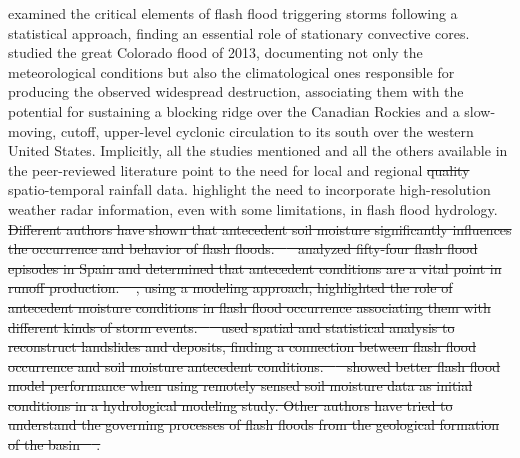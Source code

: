 \documentclass[hess, manuscript]{copernicus} %
\providecommand{\DIFadd}[1]{{\protect\color{blue}\uwave{#1}}} %
\providecommand{\DIFdel}[1]{{\protect\color{red}\sout{#1}}}                      %
\providecommand{\DIFaddbegin}{} %
\providecommand{\DIFaddend}{} %
\providecommand{\DIFdelbegin}{} %
\providecommand{\DIFdelend}{} %
\begin{document}
{{\citet{Piper2016} }\hspace{0pt}%
examined the critical elements of flash flood triggering storms following a statistical approach, finding an essential role of stationary convective cores. \mbox{%
\citet{Gochis2015} }\hspace{0pt}%
studied the great Colorado flood of 2013, documenting not only the meteorological conditions but also the climatological ones responsible for producing the observed widespread destruction, associating them with the potential for sustaining a  blocking ridge over the Canadian Rockies and a slow-moving, cutoff, upper-level cyclonic circulation to its south over the western United States. Implicitly, all the studies mentioned }\DIFdelend \DIFaddbegin \DIFadd{Implicitly, these studies }\DIFaddend and all the others available in the peer-reviewed literature point to the need for local and regional \DIFdelbegin \DIFdel{quality }\DIFdelend \DIFaddbegin \DIFadd{high-quality  }\DIFaddend spatio-temporal rainfall data. \citet{BERNE2013} highlight the need to incorporate high-resolution weather radar information, even with some limitations, in flash flood hydrology. \\

\DIFdelbegin \DIFdel{Different authors have shown that antecedent soil moisture significantly influences the occurrence and behavior of flash floods.   \mbox{%
\citet{Rodriguez2012}  }\hspace{0pt}%
analyzed fifty-four flash flood episodes in Spain and determined that antecedent conditions are a vital point in runoff production.  \mbox{%
\citet{Castillo2003}}\hspace{0pt}%
, using a modeling approach, highlighted the role of antecedent moisture conditions in flash flood occurrence associating them with different kinds of storm events. \mbox{%
\citet{Aronica2012} }\hspace{0pt}%
used spatial and statistical analysis to reconstruct landslides and deposits, finding a connection between flash flood occurrence and soil moisture antecedent conditions. \mbox{%
\citet{Tramblay2012b} }\hspace{0pt}%
showed better flash flood model performance when using remotely sensed soil moisture data as initial conditions in a hydrological modeling study. Other authors have tried to understand the governing processes of flash floods from the geological formation of the basin \mbox{%
\citep{Adamovic2016, Vannier2016}}\hspace{0pt}%
.}%
\end{document}
